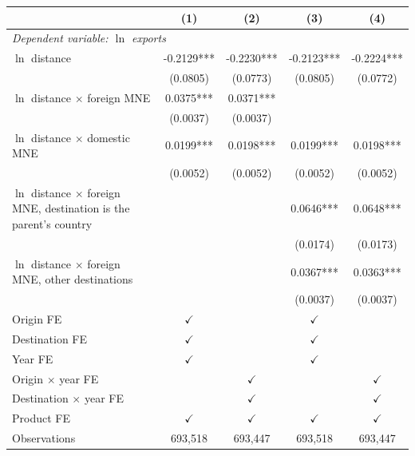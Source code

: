 \begin{tabular}{lcccc} \hline
 & (1) & (2) & (3) & (4) \\ \hline
\multicolumn{5}{l}{\textit{Dependent variable: $\ln$ exports}} \\
$\ln$ distance & -0.2129*** & -0.2230*** & -0.2123*** & -0.2224*** \\
 & (0.0805) & (0.0773) & (0.0805) & (0.0772) \\
$\ln$ distance $\times$ foreign MNE & 0.0375*** & 0.0371*** &  &  \\
 & (0.0037) & (0.0037) &  &  \\
$\ln$ distance $\times$ domestic MNE & 0.0199*** & 0.0198*** & 0.0199*** & 0.0198*** \\
 & (0.0052) & (0.0052) & (0.0052) & (0.0052) \\
$\ln$ distance $\times$ foreign MNE, destination is the parent's country &  &  & 0.0646*** & 0.0648*** \\
 &  &  & (0.0174) & (0.0173) \\
$\ln$ distance $\times$ foreign MNE, other destinations &  &  & 0.0367*** & 0.0363*** \\
 &  &  & (0.0037) & (0.0037) \\
\hline
Origin FE & $\checkmark$ &  & $\checkmark$ &  \\
Destination FE & $\checkmark$ &  & $\checkmark$ &  \\
Year FE & $\checkmark$ &  & $\checkmark$ &  \\
Origin $\times$ year FE &  & $\checkmark$ &  & $\checkmark$ \\
Destination $\times$ year FE &  & $\checkmark$ &  & $\checkmark$ \\
Product FE & $\checkmark$ & $\checkmark$ & $\checkmark$ & $\checkmark$ \\
Observations & 693,518 & 693,447 & 693,518 & 693,447 \\
\hline
\end{tabular}
